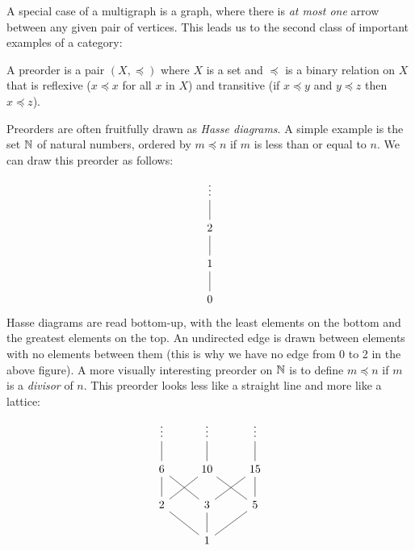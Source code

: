 A special case of a multigraph is a graph, where there is \emph{at most one} arrow between any given pair of vertices.
This leads us to the second class of important examples of a category:
\begin{definition}[preorder]
  \sloppy
  A preorder is a pair \((X,\preceq)\)
  where \(X\) is a set and \(\preceq\)
  is a binary relation on \(X\)
  that is reflexive (\(x\preceq x\) for all \(x\) in \(X\))
  and transitive (if \(x \preceq y\) and \(y\preceq z\) then \(x \preceq z\)).
\end{definition}
Preorders are often fruitfully drawn as \emph{Hasse diagrams}.
A simple example is the set \(\mathbb N\) of natural numbers,
ordered by \(m\preceq n\) if \(m\) is less than or equal to \(n\).
We can draw this preorder as follows:
\[
\begin{tikzcd}
\vdots \arrow[d, no head] \\
2 \arrow[d, no head]      \\
1 \arrow[d, no head]      \\
0
\end{tikzcd}\]
Hasse diagrams are read bottom-up, with the least elements 
on the bottom and the greatest elements on the top. 
An undirected edge is drawn between elements with no elements 
between them (this is why we have no edge from 0 to 2 in the above figure).
A more visually interesting preorder on \(\mathbb N\)
is to define \(m \preceq n\) if \(m\) is a \emph{divisor} of \(n\).
This preorder looks less like a straight line and more like a lattice:
\[
\begin{tikzcd}
\vdots                                                      & \vdots                                                        & \vdots                                                       \\
6 \arrow[rd, no head] \arrow[d, no head] \arrow[u, no head] & 10 \arrow[ld, no head] \arrow[rd, no head] \arrow[u, no head] & 15 \arrow[ld, no head] \arrow[d, no head] \arrow[u, no head] \\
2 \arrow[rd, no head]                                       & 3 \arrow[d, no head]                                          & 5 \arrow[ld, no head]                                        \\
                                                            & 1                                                             &
\end{tikzcd}
\]
